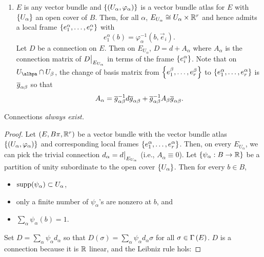\documentclass[main.tex]{subfiles}
\begin{document}
\begin{exmp}
\begin{enumerate}
        \item $E$ is any vector bundle and $\left\{ \left( U_\alpha, \varphi_\alpha \right)\right\}$ is a vector bundle atlas for $E$ with $\left\{U_\alpha\right\}$ an open cover of $B$. Then, for all $\alpha$, $E_{U_\alpha} \cong U_\alpha \times \mathbb{R}^r$ and hence admits a local frame $\left\{ e_1^\alpha, \dots, e_r^\alpha \right\}$ with 
        \[
        e_1^\alpha(b) = \varphi_\alpha^{-1}(b, \vec{e}_i).
        \] Let $D$ be a connection on $E$. Then on $E_{U_\alpha}$, $D = d + A_\alpha$ where $A_\alpha$ is the connection matrix of $D\big|_{E_{U_\alpha}}$ in terms of the frame $\left\{e_i^\alpha\right\}$. Note that on $U_\alhpa \cap U_\beta$, the change of basis matrix from $\left\{e_1^\beta, \dots, e_r^\beta \right\}$ to $\left\{ e_1^\alpha, \dots, e_r^\alpha \right\}$ is $\overline{g}_{\alpha\beta}$ so that
        \[
        A_\alpha = \overline{g}_{\alpha\beta}^{-1}d\overline{g}_{\alpha\beta} + \overline{g}_{\alpha\beta}^{-1} A_\beta \overline{g}_{\alpha\beta}.
        \]
    \end{enumerate}
    \end{exmp}
    
    \begin{prop}
        Connections \it{always} exist.
    \end{prop}
    
    \begin{proof}
        Let $(E,B \pi, \mathbb{R}^r)$ be a vector bundle with the vector bundle atlas $\left\{\left( U_\alpha, \varphi_\alpha \right)\right\}$ and corresponding local frames $\left\{e_1^\alpha, \dots, e_r^\alpha\right\}$. Then, on every $E_{U_\alpha}$, we can pick the trivial connection $d_\alpha  = d\big|_{E_{U_\alpha}}$ (i.e., $A_\alpha \equiv 0$). Let $\left\{\psi_\alpha: B \to \mathbb{R} \right\}$ be a partition of unity subordinate to the open cover $\left\{U_\alpha\right\}$. Then for every $b\in B$,
        \begin{itemize}
            \item $\text{supp}(\psi_\alpha) \subset U_\alpha$, 
            \item only a finite number of $\psi_\alpha$'s are nonzero at $b$, and
            \item $\sum_\alpha \psi_\alpha(b) = 1$. 
        \end{itemize}
        Set $D = \sum_\alpha \psi_\alpha d_\alpha$ so that $D(\sigma) = \sum_\alpha \psi_\alpha d_\alpha \sigma$ for all $\sigma \in \Gamma\left( E \right)$. $D$ is a connection because it is $\mathbb{R}$ linear, and the Leibniz rule hols:
    \end{proof}
    
\end{document}

